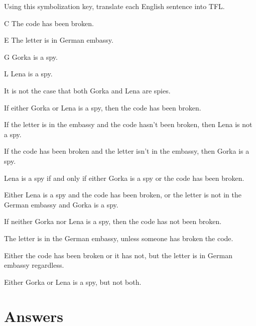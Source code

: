 \problempart
\label{pr.spies}
Using this symbolization key, translate each English sentence into TFL.
\begin{ekey}
\item[C] The code has been broken.
\item[E] The letter is in German embassy.
\item[G] Gorka is a spy.
\item[L] Lena is a spy.
\end{ekey}
\begin{earg}
\item It is not the case that both Gorka and Lena are spies.
\item If either Gorka or Lena is a spy, then the code has been broken.

\item If the letter is in the embassy and the code hasn't been broken, then Lena is not a spy.
\item If the code has been broken and the letter isn't in the embassy, then Gorka is a spy.
\item Lena is a spy if and only if either Gorka is a spy or the code has been broken.
\item Either Lena is a spy and the code has been broken, or the letter is not in the German embassy and Gorka is a spy. 

\item If neither Gorka nor Lena is a spy, then the code has not been broken.
\item The letter is in the German embassy, unless someone has broken the code.
\item Either the code has been broken or it has not, but the letter is in German embassy regardless.
\item Either Gorka or Lena is a spy, but not both.
\end{earg}




\section{Answers}
\setcounter{ProbPart}{0}


